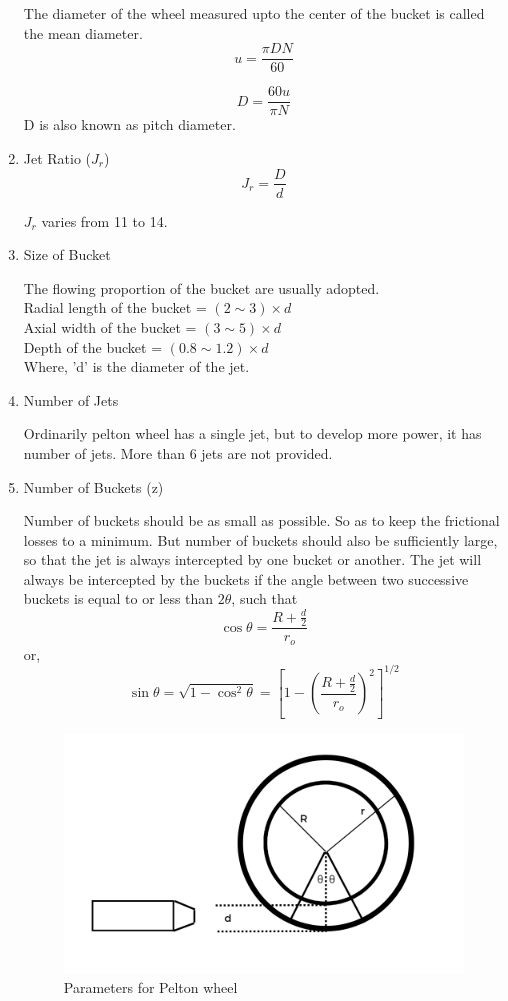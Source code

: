 \documentclass{article}
\begin{document}
\begin{enumerate}
The diameter of the wheel measured upto the center of the bucket is called the mean diameter. 
$$u = \frac{\pi D N}{60}$$

\begin{equation}
  D = \frac{60 u}{\pi N}
\end{equation}
D is also known as pitch diameter. 

\item Jet Ratio ($J_r$)
\begin{equation}
  J_r = \frac{D}{d} 
\end{equation}

$J_r$ varies from 11 to 14. 

\item Size of Bucket 

The flowing proportion of the bucket are usually adopted. \\
Radial length of the bucket = $(2 \sim 3) \times d $\\
Axial width of the bucket = $(3 \sim 5) \times d $ \\
Depth of the bucket = $(0.8 \sim 1.2) \times d $ \\
Where, 'd' is the diameter of the jet. 

\item Number of Jets

Ordinarily pelton wheel has a single jet, but to develop more power, it has number of jets. More than 6 jets are not provided. 

\item Number of Buckets (z)

Number of buckets should be as small as possible. So as to keep the frictional losses to a minimum. But number of buckets should also be sufficiently large, so that the jet is always intercepted by one bucket or another. The jet will always be intercepted by the buckets if the angle between two successive buckets is equal to or less than $2\theta$, such that $$\cos \theta = \frac{R+\frac{d}{2}}{r_o}$$
or, $$\sin \theta = \sqrt{1 - \cos^2 \theta} = \left[1- \left(\frac{R + \frac{d}{2}}{r_o}\right)^2\right]^{1/2} $$

\begin{figure}[H]
  \begin{center}
    \includegraphics[width=0.9\linewidth]{img/number_of_bucket.png}
    \caption{Parameters for Pelton wheel}
  \end{center}
\end{figure} 


\end{enumerate}
\end{document}
